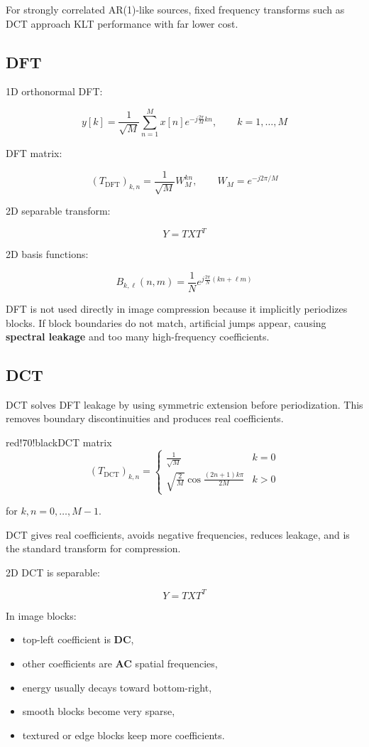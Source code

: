 For strongly correlated AR(1)-like sources, fixed frequency transforms such as DCT approach KLT performance with far lower cost.

\subsection{DFT}

1D orthonormal DFT:

\[
y[k]
=
\frac{1}{\sqrt{M}}\sum_{n=1}^{M}x[n]e^{-j\frac{2\pi}{M}kn},
\qquad
k=1,\ldots,M
\]

DFT matrix:

\[
(T_{\text{DFT}})_{k,n}
=
\frac{1}{\sqrt{M}}W_M^{kn},
\qquad
W_M=e^{-j2\pi/M}
\]

2D separable transform:

\[
Y=TXT^T
\]

2D basis functions:

\[
B_{k,\ell}(n,m)
=
\frac{1}{N}e^{j\frac{2\pi}{N}(kn+\ell m)}
\]

DFT is not used directly in image compression because it implicitly periodizes blocks. If block boundaries do not match, artificial jumps appear, causing \textbf{spectral leakage} and too many high-frequency coefficients.

\subsection{DCT}

DCT solves DFT leakage by using symmetric extension before periodization. This removes boundary discontinuities and produces real coefficients.

\begin{calloutbox}{red!70!black}{DCT matrix}
\[
(T_{\text{DCT}})_{k,n}
=
\begin{cases}
\frac{1}{\sqrt{M}} & k=0\\
\sqrt{\frac{2}{M}}
\cos\frac{(2n+1)k\pi}{2M} & k>0
\end{cases}
\]

for $k,n=0,\ldots,M-1$.

DCT gives real coefficients, avoids negative frequencies, reduces leakage, and is the standard transform for compression.
\end{calloutbox}

2D DCT is separable:

\[
Y=TXT^T
\]

In image blocks:

\begin{itemize}
  \item top-left coefficient is \textbf{DC},
  \item other coefficients are \textbf{AC} spatial frequencies,
  \item energy usually decays toward bottom-right,
  \item smooth blocks become very sparse,
  \item textured or edge blocks keep more coefficients.
\end{itemize}

